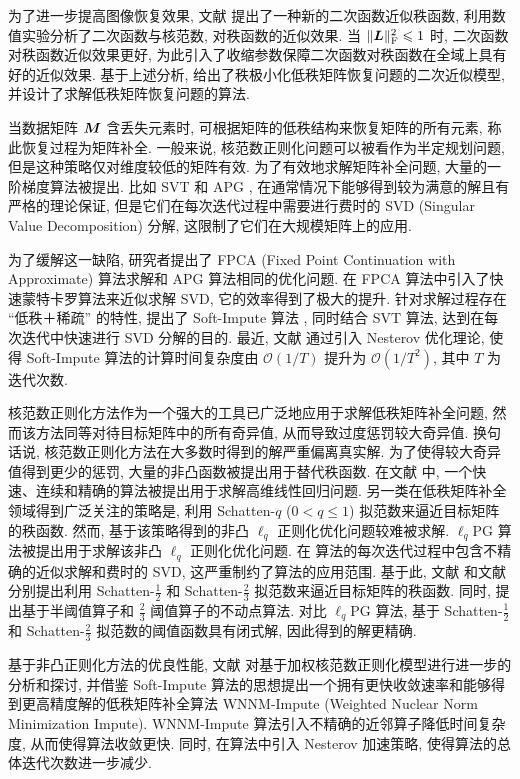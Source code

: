 \documentclass[12pt]{article}
\begin{document}
为了进一步提高图像恢复效果, 文献 \cite{hao2021low} 提出了一种新的二次函数近似秩函数, 利用数值实验分析了二次函数与核范数, 对秩函数的近似效果. 当 $\|\bm{L}\|_{\text{F}}^2\leqslant1$ 时, 二次函数对秩函数近似效果更好, 为此引入了收缩参数保障二次函数对秩函数在全域上具有好的近似效果. 基于上述分析, 给出了秩极小化低秩矩阵恢复问题的二次近似模型, 并设计了求解低秩矩阵恢复问题的算法.

当数据矩阵 $\bm{M}$ 含丢失元素时, 可根据矩阵的低秩结构来恢复矩阵的所有元素, 称此恢复过程为矩阵补全. 一般来说, 核范数正则化问题可以被看作为半定规划问题, 但是这种策略仅对维度较低的矩阵有效. 为了有效地求解矩阵补全问题, 大量的一阶梯度算法被提出. 比如 SVT \cite{cai2010singular} 和 APG \cite{lin2009fast}, 在通常情况下能够得到较为满意的解且有严格的理论保证, 但是它们在每次迭代过程中需要进行费时的 SVD (Singular Value Decomposition) 分解, 这限制了它们在大规模矩阵上的应用.

为了缓解这一缺陷, 研究者提出了 FPCA (Fixed Point Continuation with Approximate) \cite{ma2011fixed} 算法求解和 APG 算法相同的优化问题. 在 FPCA 算法中引入了快速蒙特卡罗算法来近似求解 SVD, 它的效率得到了极大的提升. 针对求解过程存在 ``低秩＋稀疏'' 的特性, 提出了 Soft-Impute 算法 \cite{mazumder2010spectral}, 同时结合 SVT 算法, 达到在每次迭代中快速进行 SVD 分解的目的. 最近, 文献 \cite{yao2015accelerated} 通过引入 Nesterov 优化理论, 使得 Soft-Impute 算法的计算时间复杂度由 $\mathcal{O}(1/T)$ 提升为 $\mathcal{O}(1/T^2)$, 其中 $T$ 为迭代次数.

核范数正则化方法作为一个强大的工具已广泛地应用于求解低秩矩阵补全问题, 然而该方法同等对待目标矩阵中的所有奇异值, 从而导致过度惩罚较大奇异值. 换句话说, 核范数正则化方法在大多数时得到的解严重偏离真实解. 为了使得较大奇异值得到更少的惩罚, 大量的非凸函数被提出用于替代秩函数. 在文献 \cite{zhang2010nearly} 中, 一个快速、连续和精确的算法被提出用于求解高维线性回归问题. 另一类在低秩矩阵补全领域得到广泛关注的策略是, 利用 Schatten-$q$ ($0<q\leqslant1$) 拟范数来逼近目标矩阵的秩函数. 然而, 基于该策略得到的非凸 $\ell_q$ 正则化优化问题较难被求解. $\ell_q$PG 算法被提出用于求解该非凸 $\ell_q$ 正则化优化问题. 在 算法的每次迭代过程中包含不精确的近似求解和费时的 SVD, 这严重制约了算法的应用范围. 基于此, 文献 \cite{peng2017s} 和文献 \cite{wang2019fast} 分别提出利用 Schatten-$\frac{1}{2}$ 和 Schatten-$\frac{2}{3}$ 拟范数来逼近目标矩阵的秩函数. 同时, 提出基于半阈值算子和 $\frac{2}{3}$ 阈值算子的不动点算法. 对比 $\ell_q$PG 算法, 基于 Schatten-$\frac{1}{2}$ 和 Schatten-$\frac{2}{3}$ 拟范数的阈值函数具有闭式解, 因此得到的解更精确.

基于非凸正则化方法的优良性能, 文献 \cite{feng2020based} 对基于加权核范数正则化模型进行进一步的分析和探讨, 并借鉴 Soft-Impute 算法的思想提出一个拥有更快收敛速率和能够得到更高精度解的低秩矩阵补全算法 WNNM-Impute (Weighted Nuclear Norm Minimization Impute). WNNM-Impute 算法引入不精确的近邻算子降低时间复杂度, 从而使得算法收敛更快. 同时, 在算法中引入 Nesterov 加速策略, 使得算法的总体迭代次数进一步减少.
\end{document}
